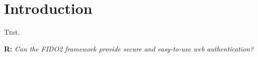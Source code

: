 
\section{Introduction}
\label{sec:intro}

\lettrine[nindent=0em,lines=3]{T}est.


\begin{displayquote}
    \textbf{R:} \emph{Can the FIDO2 framework provide secure and easy-to-use web authentication?}
\end{displayquote}